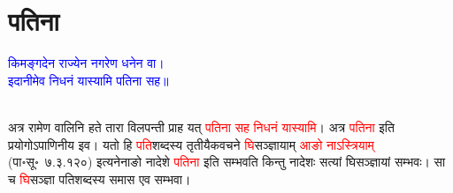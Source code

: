 \section[पतिना]{पतिना}
\label{sec:patina}
\centering\textcolor{blue}{किमङ्गदेन राज्येन नगरेण धनेन वा।\nopagebreak\\
इदानीमेव निधनं यास्यामि पतिना सह॥}\nopagebreak\\
\\
\begin{sloppypar}\justifying\noindent\hspace{10mm} अत्र रामेण वालिनि हते तारा विलपन्ती प्राह यत् \textcolor{red}{पतिना सह निधनं यास्यामि}। अत्र \textcolor{red}{पतिना} इति प्रयोगोऽपाणिनीय इव। यतो हि \textcolor{red}{पति}\-शब्दस्य तृतीयैक\-वचने \textcolor{red}{घि}\-सञ्ज्ञायाम् \textcolor{red}{आङो नाऽस्त्रियाम्‌} (पा॰सू॰~७.३.१२०) इत्यनेनाङो नादेशे \textcolor{red}{पतिना} इति सम्भवति किन्तु नादेशः सत्यां घिसञ्ज्ञायां 
सम्भवः।
सा च \textcolor{red}{घि}\-सञ्ज्ञा पति\-शब्दस्य समास एव 
सम्भवा।

\end{sloppypar}
